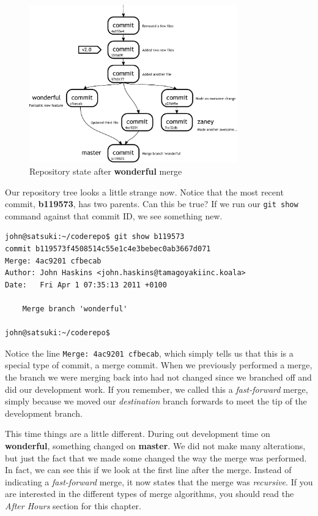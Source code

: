 \begin{figure}[hbt]
\centering
\includegraphics[width=9cm]{images/f-w4-d5.pdf}
\caption{Repository state after \textbf{wonderful} merge}
\end{figure}

Our repository tree looks a little strange now.
Notice that the most recent commit, \textbf{b119573}, has two parents.
Can this be true?  If we run our \texttt{git show} command against that commit ID, we see something new.

\begin{Verbatim}
john@satsuki:~/coderepo$ git show b119573
commit b119573f4508514c55e1c4e3bebec0ab3667d071
Merge: 4ac9201 cfbecab
Author: John Haskins <john.haskins@tamagoyakiinc.koala>
Date:   Fri Apr 1 07:35:13 2011 +0100

    Merge branch 'wonderful'

john@satsuki:~/coderepo$
\end{Verbatim}

Notice the line \texttt{Merge: 4ac9201 cfbecab}, which simply tells us that this is a special type of commit, a merge commit.
When we previously performed a merge, the branch we were merging back into had not changed since we branched off and did our development work.
If you remember, we called this a \emph{fast-forward} merge, simply because we moved our \emph{destination} branch forwards to meet the tip of the development branch.

This time things are a little different.
During out development time on \textbf{wonderful}, something changed on \textbf{master}.
We did not make many alterations, but just the fact that we made some changed the way the merge was performed.
In fact, we can see this if we look at the first line after the merge.
Instead of indicating a \emph{fast-forward} merge, it now states that the merge was \emph{recursive}.
If you are interested in the different types of merge algorithms, you should read the \emph{After Hours} section for this chapter.

